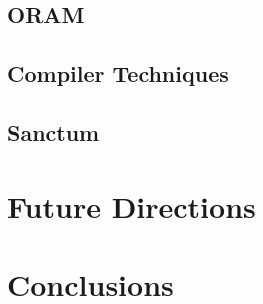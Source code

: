 \subsection{ORAM}

\subsection{Compiler Techniques}


\subsection{Sanctum}

\section{Future Directions}

\section{Conclusions}
